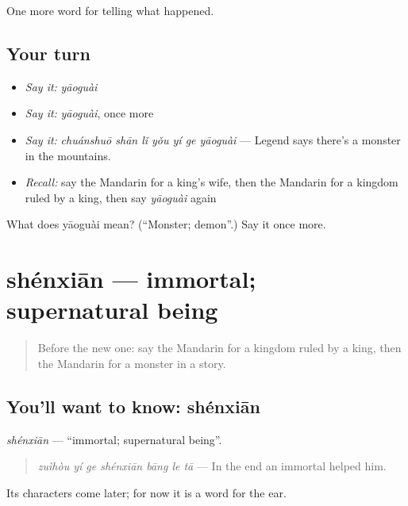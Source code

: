 \begin{grammarlens}[title={What you've built}]
One more word for telling what happened.
\end{grammarlens}

\subsection*{Your turn}
\begin{itemize}
\raggedright
  \item \emph{Say it:} \emph{yāoguài}
  \item \emph{Say it:} \emph{yāoguài}, once more
  \item \emph{Say it:} \emph{chuánshuō shān lǐ yǒu yí ge yāoguài} — Legend says there's a monster in the mountains.
  \item \emph{Recall:} say the Mandarin for a king's wife, then the Mandarin for a kingdom ruled by a king, then say \emph{yāoguài} again
\end{itemize}

\begin{tcolorbox}[breakable,colback=teal!4,colframe=teal!35!black,title={Before you move on}]
What does yāoguài mean? (\textquotedblleft{}Monster; demon\textquotedblright{}.) Say it once more.
\end{tcolorbox}
\section[shénxiān]{shénxiān — immortal; supernatural being}

\label{lesson:ZH-C331-shenxian}



\begin{quote}
Before the new one: say the Mandarin for a kingdom ruled by a king, then the Mandarin for a monster in a story.
\end{quote}

\subsection*{You'll want to know: shénxiān}
\emph{shénxiān} — \textquotedblleft{}immortal; supernatural being\textquotedblright{}.

\begin{quote}
\emph{zuìhòu yí ge shénxiān bāng le tā} — In the end an immortal helped him.
\end{quote}

Its characters come later; for now it is a word for the ear.

